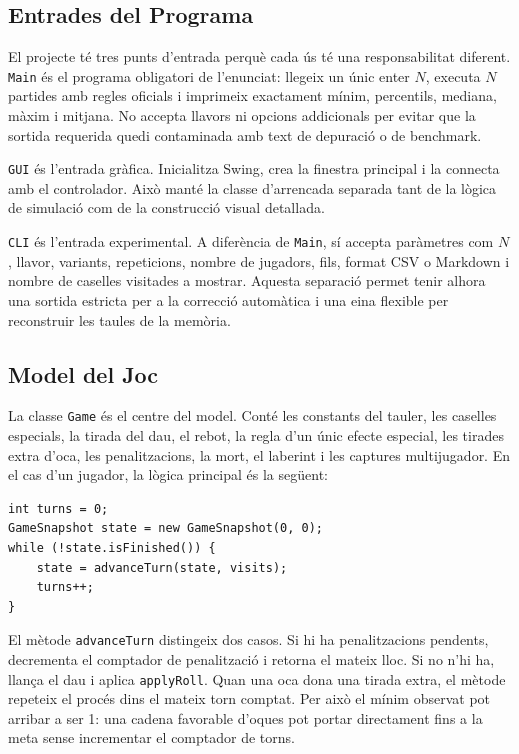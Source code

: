 \documentclass[conference,compsoc]{IEEEtran}
\begin{document}
\subsection{Entrades del Programa}

El projecte té tres punts d'entrada perquè cada ús té una responsabilitat diferent.
\texttt{Main} és el programa obligatori de l'enunciat: llegeix un únic enter $N$,
executa $N$ partides amb regles oficials i imprimeix exactament mínim, percentils,
mediana, màxim i mitjana. No accepta llavors ni opcions addicionals per evitar que
la sortida requerida quedi contaminada amb text de depuració o de benchmark.

\texttt{GUI} és l'entrada gràfica. Inicialitza Swing, crea la finestra principal
i la connecta amb el controlador. Això manté la classe d'arrencada separada tant
de la lògica de simulació com de la construcció visual detallada.

\texttt{CLI} és l'entrada experimental. A diferència de \texttt{Main}, sí accepta
paràmetres com $N$, llavor, variants, repeticions, nombre de jugadors, fils, format
CSV o Markdown i nombre de caselles visitades a mostrar. Aquesta separació permet
tenir alhora una sortida estricta per a la correcció automàtica i una eina flexible
per reconstruir les taules de la memòria.

\subsection{Model del Joc}

La classe \texttt{Game} és el centre del model. Conté les constants del tauler, les
caselles especials, la tirada del dau, el rebot, la regla d'un únic efecte especial,
les tirades extra d'oca, les penalitzacions, la mort, el laberint i les captures
multijugador. En el cas d'un jugador, la lògica principal és la següent:

\begin{lstlisting}[caption={Esquema de simulació d'una partida.},label={lst:partida}]
int turns = 0;
GameSnapshot state = new GameSnapshot(0, 0);
while (!state.isFinished()) {
    state = advanceTurn(state, visits);
    turns++;
}
\end{lstlisting}

El mètode \texttt{advanceTurn} distingeix dos casos. Si hi ha penalitzacions
pendents, decrementa el comptador de penalització i retorna el mateix lloc. Si no
n'hi ha, llança el dau i aplica \texttt{applyRoll}. Quan una oca dona una tirada
extra, el mètode repeteix el procés dins el mateix torn comptat. Per això el mínim
observat pot arribar a ser 1: una cadena favorable d'oques pot portar directament
fins a la meta sense incrementar el comptador de torns.
\end{document}
